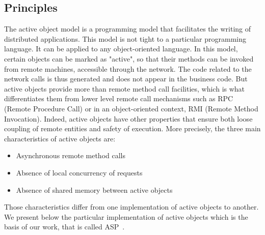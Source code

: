 \documentclass[11pt]{report}
\begin{document}
\subsection{Principles}\label{sec:activeobjects}
The active object model is a programming model that facilitates the writing of distributed applications. This model is not tight to a particular programming language. It can be applied to any object-oriented language. In this model, certain objects can be marked as "active", so that their methods can be invoked from remote machines, accessible through the network. The code related to the network calls is thus generated and does not appear in the business code. But active objects provide more than remote method call facilities, which is what differentiates them from lower level remote call mechanisms such as RPC (Remote Procedure Call)\cite{ref:rpc} or in an object-oriented context, RMI (Remote Method Invocation)\cite{ref:rmi}. Indeed, active objects have other properties that ensure both loose coupling of remote entities and safety of execution. More precisely, the three main characteristics of active objects are:
\begin{itemize}
\item Asynchronous remote method calls
\item Absence of local concurrency of requests
\item Absence of shared memory between active objects
\end{itemize}

Those characteristics differ from one implementation of active objects to another. We present below the particular implementation of active objects which is the basis of our work, that is called ASP~\cite{ref:asp}.
\end{document}
